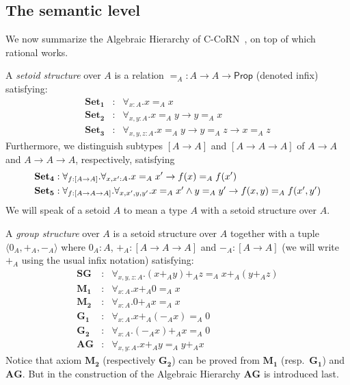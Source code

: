 \documentclass[numreferences]{kluwer}
\newcommand{\Prop}{{\textsf{Prop}}}
\newcommand{\tacticname}[1]{\textsf{#1}}
\newcommand{\rational}{\tacticname{rational}}
\newcommand{\axiom}[1]{\ensuremath{\mathbf{#1}}}
\begin{document}
\begin{article}
\subsection{The semantic level}\label{structures}

We now summarize the Algebraic Hierarchy of C-CoRN~\cite{geu:pol:wie:zwa:02},
on top of which {\rational} works.

\begin{definition}
A \emph{setoid structure} over $A$ is a relation
$=_A:A\to A\to\Prop$ (denoted infix) satisfying:
\begin{eqnarray*}
\axiom{Set_1} & : & \forall_{x:A}.x=_A x \\
\axiom{Set_2} & : & \forall_{x,y:A}.x=_A y\to y=_A x\\
\axiom{Set_3} & : & \forall_{x,y,z:A}.x=_A y\to y=_A z\to x=_A z
\end{eqnarray*}
Furthermore, we distinguish subtypes $[A\to A]$ and $[A\to A\to A]$ of
$A\to A$ and $A\to A\to A$, respectively, satisfying
\[
\begin{array}{l}
\displaystyle
\axiom{Set_4} :
 \forall_{f:[A\to A]}.\forall_{x,x':A}.x=_A x'\to f(x)=_A f(x')\smallskip\\
\axiom{Set_5} : \forall_{f:[A\to A\to A]}.
 \forall_{x,x',y,y'}.x=_A x'\wedge y=_A y'\to f(x,y)=_A f(x',y')
\end{array}\]
We will speak of a setoid $A$ to mean a type $A$ with a setoid structure over
$A$.
\end{definition}

\begin{definition}
A \emph{group structure} over $A$ is a setoid structure over $A$ together
with a tuple $\langle 0_A,+_A,-_A\rangle$ where $0_A:A$, $+_A:[A\to
A\to A]$ and $-_A:[A\to A]$ (we will write $+_A$ using the usual infix
notation) satisfying:
\begin{eqnarray*}
\axiom{SG} & : & \forall_{x,y,z:A}.(x+_A y)+_A z=_A x+_A(y+_A z) \\
\axiom{M_1} & : & \forall_{x:A}.x+_A 0=_A x\\
\axiom{M_2} & : & \forall_{x:A}.0+_A x=_A x\\
\axiom{G_1} & : & \forall_{x:A}.x+_A (-_A x)=_A 0\\
\axiom{G_2} & : & \forall_{x:A}.(-_A x)+_A x=_A 0\\
\axiom{AG} & : & \forall_{x,y:A}.x+_A y=_A y+_A x
\end{eqnarray*}
Notice that axiom \axiom{M_2} (respectively \axiom{G_2}) can be proved
from \axiom{M_1} (resp.\ \axiom{G_1}) and \axiom{AG}.  But in the construction
of the Algebraic Hierarchy \axiom{AG} is introduced last.


\end{definition}
\end{article}
\end{document}
